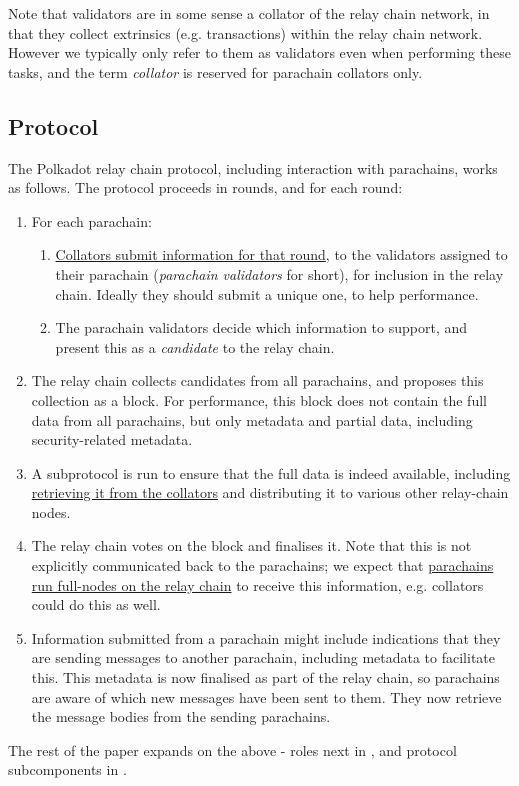 Note that validators are in some sense a collator of the relay chain network, in that they collect extrinsics (e.g. transactions) within the relay chain network. However we typically only refer to them as validators even when performing these tasks, and the term \emph{collator} is reserved for parachain collators only.

\subsection{Protocol}

The Polkadot relay chain protocol, including interaction with parachains, works as follows. The protocol proceeds in rounds, and for each round:

\begin{enumerate}
\item For each parachain:

  \begin{enumerate}
    \item \uline{Collators submit information for that round}, to the validators assigned to their parachain (\emph{parachain validators} for short), for inclusion in the relay chain. Ideally they should submit a unique one, to help performance.
    \item The parachain validators decide which information to support, and present this as a \emph{candidate} to the relay chain.
  \end{enumerate}

\item The relay chain collects candidates from all parachains, and proposes this collection as a block. For performance, this block does not contain the full data from all parachains, but only metadata and partial data, including security-related metadata.

\item A subprotocol is run to ensure that the full data is indeed available, including \uline{retrieving it from the collators} and distributing it to various other relay-chain nodes.

\item The relay chain votes on the block and finalises it. Note that this is not explicitly communicated back to the parachains; we expect that \uline{parachains run full-nodes on the relay chain} to receive this information, e.g. collators could do this as well.

\item Information submitted from a parachain might include indications that they are sending messages to another parachain, including metadata to facilitate this. This metadata is now finalised as part of the relay chain, so parachains are aware of which new messages have been sent to them. They now retrieve the message bodies from the sending parachains.
\end{enumerate}


The rest of the paper expands on the above - roles next in , and protocol subcomponents in .
